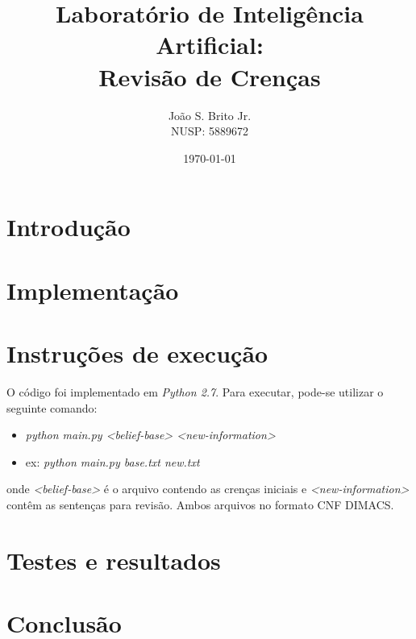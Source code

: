 \documentclass[10pt,a4paper]{amsart}
\author{Jo\~ao S. Brito Jr.\\NUSP: 5889672}
\title{Laboratório de Inteligência Artificial: \\Revisão de Crenças}
\date{\today}
\begin{document}

\maketitle

\section{Introdução}

\section{Implementação}
\section{Instruções de execução}
O código foi implementado em \textit{Python 2.7}.
Para executar, pode-se utilizar o seguinte comando:
\begin{itemize}
 \item[] \emph{python main.py <belief-base> <new-information>}
 \item[] ex: \emph{python main.py base.txt new.txt}
\end{itemize}

onde \emph{<belief-base>} é o arquivo contendo as crenças iniciais e \emph{<new-information>} contêm as sentenças para revisão. Ambos arquivos no formato CNF DIMACS.

\section{Testes e resultados}




\section{Conclusão}

\end{document}
